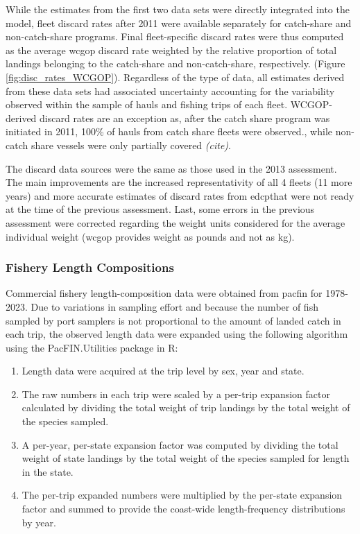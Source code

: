 \documentclass[11pt,
  english,
  letterpaper,
]{article}
\providecommand{\tightlist}{%
  \setlength{\itemsep}{0pt}\setlength{\parskip}{0pt}}
\providecommand{\tightlist}{%
  \setlength{\itemsep}{0pt}\setlength{\parskip}{0pt}}
\begin{document}
While the estimates from the first two data sets were directly integrated into the model, fleet discard rates after 2011 were available separately for catch-share and non-catch-share programs. Final fleet-specific discard rates were thus computed as the average \gls{wcgop} discard rate weighted by the relative proportion of total landings belonging to the catch-share and non-catch-share, respectively. (Figure \ref{fig:disc_rates_WCGOP}). Regardless of the type of data, all estimates derived from these data sets had associated uncertainty accounting for the variability observed within the sample of hauls and fishing trips of each fleet. WCGOP-derived discard rates are an exception as, after the catch share program was initiated in 2011, 100\% of hauls from catch share fleets were observed., while non-catch share vessels were only partially covered \emph{\emph{(cite)}}.

The discard data sources were the same as those used in the 2013 assessment. The main improvements are the increased representativity of all 4 fleets (11 more years) and more accurate estimates of discard rates from \gls{edcp}that were not ready at the time of the previous assessment. Last, some errors in the previous assessment were corrected regarding the weight units considered for the average individual weight (\gls{wcgop} provides weight as pounds and not as kg).

\hypertarget{fishery-length-compositions}{%
\subsubsection{Fishery Length Compositions}\label{fishery-length-compositions}}

Commercial fishery length-composition data were obtained from \gls{pacfin} for 1978-2023. Due to variations in sampling effort and because the number of fish sampled by port samplers is not proportional to the amount of landed catch in each trip, the observed length data were expanded using the following algorithm using the PacFIN.Utilities package in R:

\begin{enumerate}
\def\labelenumi{\arabic{enumi}.}
\tightlist
\item
  Length data were acquired at the trip level by sex, year and state.
\item
  The raw numbers in each trip were scaled by a per-trip expansion factor calculated by dividing the total weight of trip landings by the total weight of the species sampled.
\item
  A per-year, per-state expansion factor was computed by dividing the total weight of state landings by the total weight of the species sampled for length in the state.
\item
  The per-trip expanded numbers were multiplied by the per-state expansion factor and summed to provide the coast-wide length-frequency distributions by year.
\end{enumerate}
\end{document}
